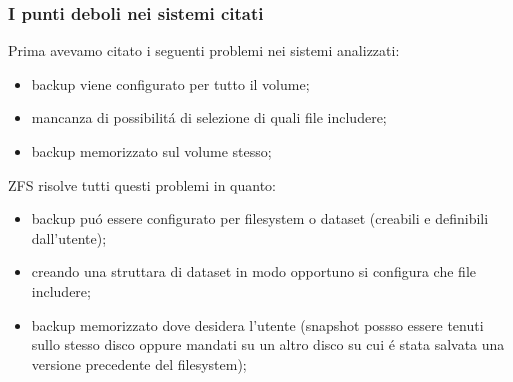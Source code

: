 \documentclass{beamer}
\begin{document}
\begin{frame}
\frametitle{I punti deboli nei sistemi citati}
Prima avevamo citato i seguenti problemi nei sistemi analizzati:
\begin{itemize}
\item backup viene configurato per tutto il volume;
\item mancanza di possibilit\'a di selezione di quali file includere;
\item backup memorizzato sul volume stesso;
\end{itemize}
\end{frame}

\begin{frame}
ZFS risolve tutti questi problemi in quanto:
\begin{itemize}
\item backup pu\'o essere configurato per filesystem o dataset (creabili e definibili dall'utente);
\item creando una struttara di dataset in modo opportuno si configura che file includere;
\item backup memorizzato dove desidera l'utente (snapshot possso essere tenuti sullo stesso disco oppure mandati su un altro disco su cui \'e stata salvata una versione precedente del filesystem);
\end{itemize}
\end{frame}
\end{document}
